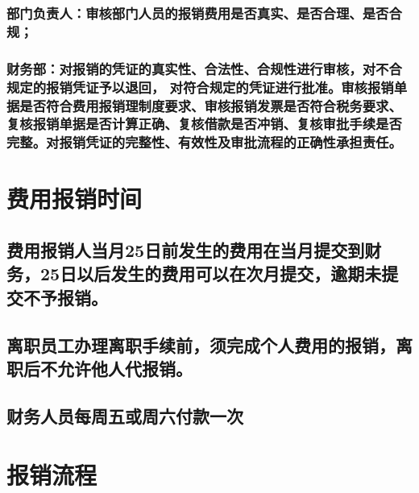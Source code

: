 \documentclass[scheme=plain,UTF8]{ctexart}
\begin{document}
\subsubsection{部门负责人：审核部门人员的报销费用是否真实、是否合理、是否合规；}
\subsubsection{财务部：对报销的凭证的真实性、合法性、合规性进行审核，对不合规定的报销凭证予以退回，
对符合规定的凭证进行批准。审核报销单据是否符合费用报销理制度要求、审核报销发票是否符合税务要求、
复核报销单据是否计算正确、复核借款是否冲销、复核审批手续是否完整。对报销凭证的完整性、有效性及审批流程的正确性承担责任。}

\section{费用报销时间}
\subsection{费用报销人当月25日前发生的费用在当月提交到财务，25日以后发生的费用可以在次月提交，逾期未提交不予报销。}
\subsection{离职员工办理离职手续前，须完成个人费用的报销，离职后不允许他人代报销。}
\subsection{财务人员每周五或周六付款一次}
\pagebreak

\section{报销流程}
\end{document}
